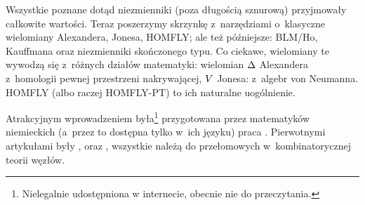 
Wszystkie poznane dotąd niezmienniki (poza długością sznurową) przyjmowały całkowite wartości.
Teraz poszerzymy skrzynkę z~narzędziami o~klasyczne wielomiany Alexandera, Jonesa, HOMFLY; ale też późniejsze: BLM/Ho, Kauffmana oraz niezmienniki skończonego typu.
Co ciekawe, wielomiany te wywodzą się z~różnych działów matematyki: wielomian $\Delta$ Alexandera z~homologii pewnej przestrzeni nakrywającej, $V$ Jonesa: z~algebr von Neumanna.
HOMFLY (albo raczej HOMFLY-PT) to ich naturalne uogólnienie.

Atrakcyjnym wprowadzeniem była\footnote{Nielegalnie udostępniona w internecie, obecnie nie do przeczytania.} przygotowana przez matematyków niemieckich (a~przez to dostępna tylko w~ich języku) praca \cite{gellert09}.
Pierwotnymi artykułami były \cite{alexander28}, \cite{jones85} oraz \cite{homfly85}, wszystkie należą do przełomowych w~kombinatorycznej teorii węzłów.

